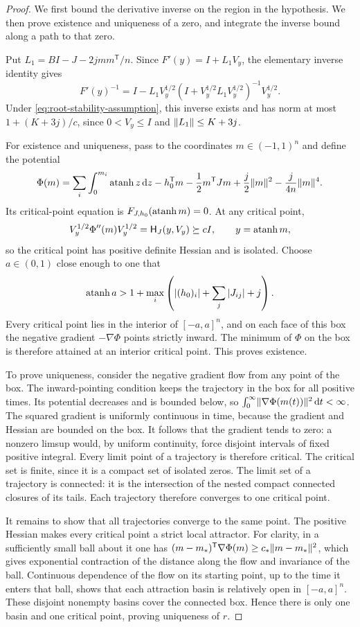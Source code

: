 \begin{proof}
We first bound the derivative inverse on the region in the hypothesis.
We then prove existence and uniqueness of a zero, and integrate the
inverse bound along a path to that zero.

Put $L_1=BI-J-2jmm^{\mathsf T}/n$. Since
$F'(y)=I+L_1V_y$, the elementary inverse identity gives
\[
 F'(y)^{-1}
 =I-L_1V_y^{1/2}
       (I+V_y^{1/2}L_1V_y^{1/2})^{-1}V_y^{1/2}.
\]
Under \eqref{eq:root-stability-assumption}, this inverse exists and
has norm at most $1+(K+3j)/c$, since $0<V_y\le I$ and
$\lVert L_1\rVert\le K+3j$.

For existence and uniqueness, pass to the coordinates
$m\in(-1,1)^n$ and define the potential
\[
 \Phi(m)=\sum_i\int_0^{m_i}\operatorname{atanh} z\,\mathrm d z-h_0^{\mathsf T}m
 -\frac12m^{\mathsf T}Jm+\frac j2\lVert m\rVert^2
 -\frac j{4n}\lVert m\rVert^4.
\]
Its critical-point equation is
$F_{J,h_0}(\operatorname{atanh} m)=0$.  At any critical point,
\[
 V_y^{1/2}\Phi''(m)V_y^{1/2}
 =\mathsf H_J(y,V_y)\succeq cI,\qquad y=\operatorname{atanh} m,
\]
so the critical point has positive definite Hessian and is isolated.
Choose $a\in(0,1)$ close enough to one that
\[
 \operatorname{atanh} a>1+\max_i\left(|(h_0)_i|+\sum_j|J_{ij}|+j\right).
\]
Every critical point lies in the interior of $[-a,a]^n$, and on each
face of this box the negative gradient $-\nabla\Phi$ points strictly
inward.  The minimum of $\Phi$ on the box is therefore attained at an
interior critical point. This proves existence.

To prove uniqueness, consider the negative gradient flow from any
point of the box. The inward-pointing condition keeps the trajectory
in the box for all positive times.  Its potential decreases and is bounded
below, so
$\int_0^\infty\lVert \nabla\Phi(m(t))\rVert^2\,\mathrm d t<\infty$.
The squared gradient is uniformly continuous in time, because the
gradient and Hessian are bounded on the box.  It follows that the
gradient tends to zero: a nonzero limsup would, by uniform
continuity, force disjoint intervals of fixed positive integral.
Every limit point of a trajectory is therefore critical.
The critical set is finite, since it is a compact set of isolated
zeros.  The limit set of a trajectory is connected: it is the
intersection of the nested compact connected closures of its tails.
Each trajectory therefore converges to one critical point.

It remains to show that all trajectories converge to the same point.
The positive Hessian makes every critical point a strict local
attractor. For clarity, in a sufficiently small ball about it one has
$(m-m_*)^{\mathsf T}\nabla\Phi(m)\ge c_*\lVert m-m_*\rVert^2$,
which gives exponential contraction of the distance along the flow
and invariance of the ball.  Continuous dependence of the flow on
its starting point, up to the time it enters that ball, shows that
each attraction basin is relatively open in $[-a,a]^n$.  These
disjoint nonempty basins cover the connected box.  Hence there is
only one basin and one critical point, proving uniqueness of $r$.


\end{proof}
